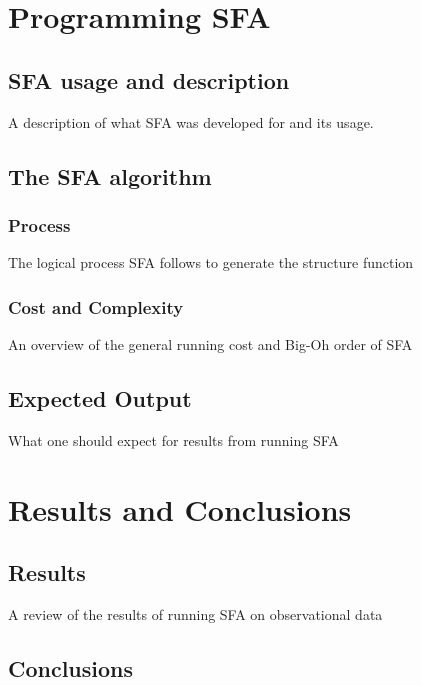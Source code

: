 \documentclass[12pt, oneside]{smuthesis}
\begin{document}
\chapter{\sc Programming SFA} \label{programmingSFA}

\section{\sc SFA usage and description} \label{usageDescription}

A description of what SFA was developed for and its usage.

\section{\sc The SFA algorithm} \label{algorithm}

\subsection{\sc Process}

The logical process SFA follows to generate the structure function

\subsection{\sc Cost and Complexity} \label{costComplexity}

An overview of the general running cost and Big-Oh order of SFA

\section{\sc Expected Output} \label{expectedOutput}

What one should expect for results from running SFA

\chapter{\sc Results and Conclusions} \label{resultsConclusions}

\section{\sc Results} \label{results}

A review of the results of running SFA on observational data

\section{\sc Conclusions} \label{conclusions}
\end{document}
